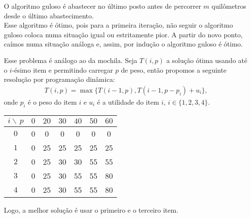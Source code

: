 \begin{questions}
\begin{solution}
    O algoritmo guloso é abastecer no último posto antes de percorrer $m$ quilômetros desde o último abastecimento.\\
    Esse algoritmo é ótimo, pois para a primeira iteração, não seguir o algoritmo guloso coloca numa situação igual ou estritamente pior. A partir do novo ponto, caímos numa situação análoga e, assim, por indução o algoritmo guloso é ótimo.
\end{solution}

\setcounter{question}{11}
\begin{solution}
    Esse problema é análogo ao da mochila. Seja $T(i,p)$ a solução ótima usando até o $i$-ésimo item e permitindo carregar $p$ de peso, então propomos a seguinte resolução por programação dinâmica:
    \begin{align*}
        T(i,p) = \max\{T(i-1,p), T(i-1,p-p_i)+u_i\},
    \end{align*}
    onde $p_i$ é o peso do item $i$ e $u_i$ é a utilidade do item $i$, $i\in\{1,2,3,4\}$.
    \begin{center}
        \begin{tabular}{c||c|c|c|c|c|c}
        $i\backslash\,p$  & $0$ & $20$ & $30$ & $40$ & $50$ & $60$ \\
        \hline \hline
        $0$ & 0 & 0 & 0 & 0 & 0 & 0\\
        \hline
        $1$ & 0 & 25 & 25 & 25 & 25 & 25\\
        \hline
        $2$ & 0 & 25 & 30 & 30 & 55 & 55\\
        \hline
        $3$ & 0 & 25 & 30 & 55 & 55 & 80\\
        \hline
        $4$ & 0 & 25 & 30 & 55 & 55 & 80\\
        \end{tabular}
    \end{center}
    Logo, a melhor solução é usar o primeiro e o terceiro item.
\end{solution}


\end{questions}
